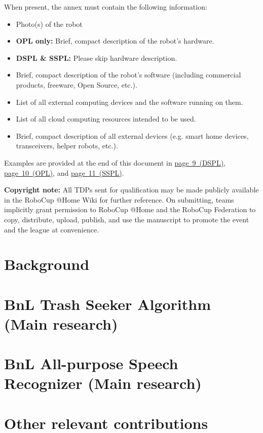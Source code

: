 \documentclass[runningheads,a4paper]{llncs}
\begin{document}
When present, the annex must contain the following information:

\begin{itemize}
	\item Photo(s) of the robot
	\item \textbf{OPL only:} Brief, compact description of the robot's hardware.
	\item \textbf{DSPL \& SSPL:} Please skip hardware description.
	\item Brief, compact description of the robot's software (including commercial products, freeware, Open Source, etc.).
	\item List of all external computing devices and the software running on them.
	\item List of all cloud computing resources intended to be used.
	\item Brief, compact description of all external devices (e.g. smart home devices, transceivers, helper robots, etc.).
\end{itemize}

Examples are provided at the end of this document in
\hyperlink{page.9}{page~9~(DSPL)},
\hyperlink{page.10}{page~10~(OPL)}, and
\hyperlink{page.11}{page~11~(SSPL)}.

\textbf{Copyright note:} All TDPs sent for qualification may be made publicly available in the RoboCup @Home Wiki for further reference. On submitting, teams implicitly grant permission to RoboCup @Home and the RoboCup Federation to copy, distribute, upload, publish, and use the manuscript to promote the event and the league at convenience.

\section{Background}
\lipsum[1-3]

\section{BnL Trash Seeker Algorithm (Main research)}
\lipsum[4-10]

\section{BnL All-purpose Speech Recognizer (Main research)}
\lipsum[11-13]

\section{Other relevant contributions}
\lipsum[14]
\end{document}
